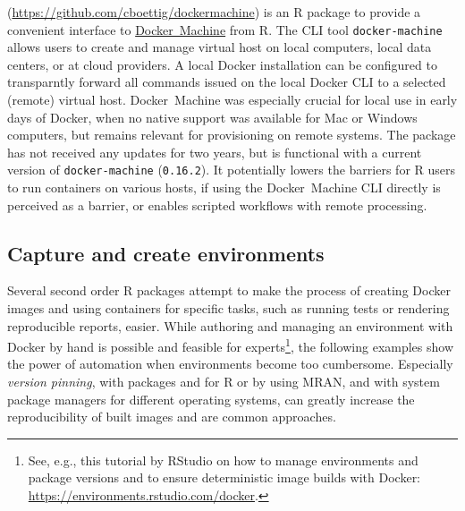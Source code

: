 \textbf{}
(\url{https://github.com/cboettig/dockermachine}) is an R package to
provide a convenient interface to
\href{https://docs.docker.com/machine/overview/}{Docker~Machine} from R.
The CLI tool \texttt{docker-machine} allows users to create and manage
virtual host on local computers, local data centers, or at cloud
providers. A local Docker installation can be configured to transparntly
forward all commands issued on the local Docker CLI to a selected
(remote) virtual host. Docker~Machine was especially crucial for local
use in early days of Docker, when no native support was available for
Mac or Windows computers, but remains relevant for provisioning on
remote systems. The package has not received any updates for two years,
but is functional with a current version of \texttt{docker-machine}
(\texttt{0.16.2}). It potentially lowers the barriers for R users to run
containers on various hosts, if using the Docker~Machine CLI directly is
perceived as a barrier, or enables scripted workflows with remote
processing.

\hypertarget{capture-and-create-environments}{%
\subsection{Capture and create
environments}\label{capture-and-create-environments}}

\label{envs}

Several second order R packages attempt to make the process of creating
Docker images and using containers for specific tasks, such as running
tests or rendering reproducible reports, easier. While authoring and
managing an environment with Docker by hand is possible and feasible for
experts\footnote{See, e.g., this tutorial by RStudio on how to manage environments and package versions and to ensure deterministic image builds with Docker: \href{https://environments.rstudio.com/docker}{https://environments.rstudio.com/docker}.},
the following examples show the power of automation when environments
become too cumbersome. Especially \emph{version pinning}, with packages
 and  for R or by using MRAN, and with system
package managers for different operating systems, can greatly increase
the reproducibility of built images and are common approaches.

